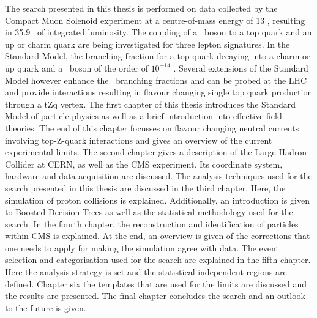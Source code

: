 The search presented in this thesis is performed on data collected by the Compact Muon Solenoid experiment at a centre-of-mass energy of 13 \TeV, resulting in 35.9 \fbinv\ of integrated luminosity. The coupling of a \PZ\ boson to a top quark and an up or charm quark are being investigated for three lepton signatures. In the Standard Model, the branching fraction for a top quark decaying into a charm or up quark and a \PZ\ boson of the order of $10^{-14}$ \cite{AguilarSaavedra:2004wm,PhysRevD.2.1285}. Several extensions of the Standard Model however enhance the \FCNC\ branching fractions and can be probed at the LHC \cite{AguilarSaavedra:2004wm} and provide interactions resulting in flavour changing single top quark production through a tZq vertex.  The first chapter of this thesis introduces the Standard Model of particle physics as well as a brief introduction into effective field theories. The end of this chapter focusses on flavour changing neutral currents involving top-Z-quark interactions and gives an overview of the current experimental limits.  The second chapter gives a description of the Large Hadron Collider at CERN, as well as the CMS experiment. Its coordinate system, hardware and data acquisition are discussed. The analysis techniques used for the search  presented in this thesis are discussed in the third chapter. Here, the simulation of proton collisions is explained.  Additionally, an introduction is given to Boosted Decision Trees as well as the statistical methodology used for the search. In the fourth chapter, the reconstruction and identification of particles within CMS is explained. At the end, an overview is given of the corrections that one needs to apply for making the simulation agree with data. The event selection and categorisation used for the search are explained in the fifth chapter. Here the analysis strategy is set and the statistical independent regions are defined. Chapter six the templates that are used for the limits are discussed and the results are presented. The final chapter concludes the search and an outlook to the future is given. 